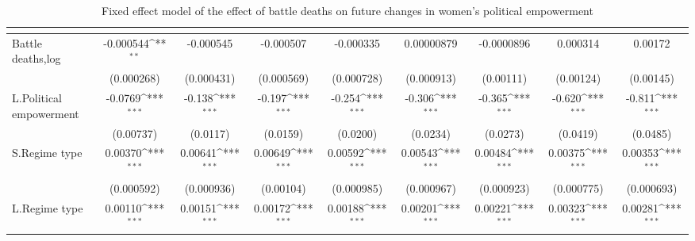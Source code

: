 \begin{table}[htbp]\centering
\def\sym#1{\ifmmode^{#1}\else\(^{#1}\)\fi}
\caption{Fixed effect model of the effect of battle deaths on future changes in women's political empowerment\label{polbdeath}}
\begin{tabular}{l*{8}{c}}
\hline\hline
                    &&&&&&&&\\
\hline
Battle deaths,log   &   -0.000544\sym{**} &   -0.000545         &   -0.000507         &   -0.000335         &  0.00000879         &  -0.0000896         &    0.000314         &     0.00172         \\
                    &  (0.000268)         &  (0.000431)         &  (0.000569)         &  (0.000728)         &  (0.000913)         &   (0.00111)         &   (0.00124)         &   (0.00145)         \\
[1em]
L.Political empowerment&     -0.0769\sym{***}&      -0.138\sym{***}&      -0.197\sym{***}&      -0.254\sym{***}&      -0.306\sym{***}&      -0.365\sym{***}&      -0.620\sym{***}&      -0.811\sym{***}\\
                    &   (0.00737)         &    (0.0117)         &    (0.0159)         &    (0.0200)         &    (0.0234)         &    (0.0273)         &    (0.0419)         &    (0.0485)         \\
[1em]
S.Regime type       &     0.00370\sym{***}&     0.00641\sym{***}&     0.00649\sym{***}&     0.00592\sym{***}&     0.00543\sym{***}&     0.00484\sym{***}&     0.00375\sym{***}&     0.00353\sym{***}\\
                    &  (0.000592)         &  (0.000936)         &   (0.00104)         &  (0.000985)         &  (0.000967)         &  (0.000923)         &  (0.000775)         &  (0.000693)         \\
[1em]
L.Regime type       &     0.00110\sym{***}&     0.00151\sym{***}&     0.00172\sym{***}&     0.00188\sym{***}&     0.00201\sym{***}&     0.00221\sym{***}&     0.00323\sym{***}&     0.00281\sym{***}\\

\end{tabular}
\end{table}
